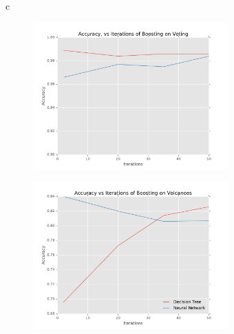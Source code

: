 \documentclass[fleqn]{homework}
\begin{document}
\begin{problem}{c}
    \begin{figure}[h!]
      \centering
      \caption{}
      \label{f:c-voting}
      \includegraphics[width=0.67\textwidth]{c-voting.pdf}
    \end{figure}
    \begin{figure}[h!]
      \centering
      \caption{}
      \label{f:c-volcanoes}
      \includegraphics[width=0.67\textwidth]{c-volcanoes.pdf}
    \end{figure}

  \end{problem}
\end{document}
